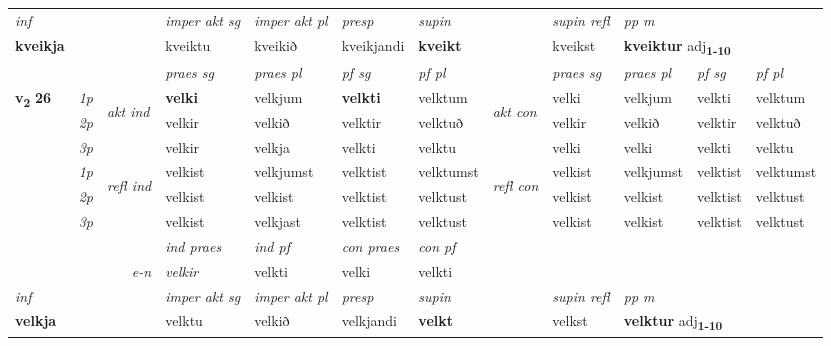 \begin{longtable}[l]{X>{\footnotesize\itshape}llXXXXlXXXX}
   {\textit{inf}} & &  & \textit{imper akt sg} & \textit{imper akt pl}   & \textit{presp} & \textit{supin} && \textit{supin refl} & \textit{pp m} \\*
  {\textbf{kveikja}} & && kveiktu  & kveikið   & kveikjandi &  \textbf{kveikt} && kveikst & \multicolumn{2}{l}{\textbf{kveiktur} adj\textbf{\textsubscript{1-10}}} \\*

\midrule

 & &   & \textit{praes sg}  & \textit{praes pl}    & \textit{ pf sg} & \textit{pf pl} & & \textit{praes sg}  & \textit{praes pl}    & \textit{pf sg} & \textit{pf pl }  \\ \cmidrule{4-7} \cmidrule{9-12}
 \multirow{2}{*}{{{\textbf{v{\textsubscript{2}}} \Large{\textbf{26}}}}}  & 1p & \multirow{3}{*}{\begin{turn}{90}\textit{akt ind}\end{turn}} & \textbf{velki} & velkjum & \textbf{velkti} & velktum & \multirow{3}{*}{\begin{turn}{90}\textit{akt con}\end{turn}} &velki & velkjum & velkti & velktum\\*
 & 2p &  &  velkir  & velkið & velktir & velktuð & & velkir & velkið & velktir & velktuð \\*
 & 3p &  & velkir & velkja & velkti & velktu & & velki & velki& velkti & velktu \\*
\cmidrule{4-7} \cmidrule{9-12}
 & 1p & \multirow{3}{*}{\begin{turn}{90}\textit{refl ind}\end{turn}}  & velkist & velkjumst & velktist & velktumst & \multirow{3}{*}{\begin{turn}{90}\textit{refl con}\end{turn}}  &velkist & velkjumst & velktist & velktumst \\*
 & 2p &  & velkist & velkist & velktist & velktust & &velkist & velkist & velktist & velktust \\*
 & 3p  & & velkist & velkjast & velktist & velktust & & velkist & velkist& velktist & velktust \\*
\cmidrule{4-7} \cmidrule{9-12}

   && &  \textit{ind praes} & \textit{ind pf} & \textit{con praes} & \textit{con pf} \\*
\multicolumn{3}{r}{\textit{e-n}} & velkir & velkti & velki & velkti \\*

\cmidrule{4-7}
   {\textit{inf}} & &  & \textit{imper akt sg} & \textit{imper akt pl}   & \textit{presp} & \textit{supin} && \textit{supin refl} & \textit{pp m} \\*
  {\textbf{velkja}} & && velktu  & velkið   & velkjandi &  \textbf{velkt} && velkst & \multicolumn{2}{l}{\textbf{velktur} adj\textbf{\textsubscript{1-10}}} \\*


\end{longtable}
